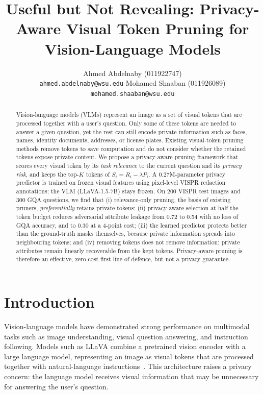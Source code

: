 \documentclass{article}
\title{Useful but Not Revealing: Privacy-Aware Visual Token Pruning
for Vision-Language Models}
\author{
  Ahmed Abdelnaby (011922747) \\
  \texttt{ahmed.abdelnaby@wsu.edu}
  \And
  Mohamed Shaaban (011926089) \\
  \texttt{mohamed.shaaban@wsu.edu}
}
\begin{document}
\maketitle

\begin{abstract}
Vision-language models (VLMs) represent an image as a set of visual tokens that are processed together with a user's question.
Only some of these tokens are needed to answer a given question, yet the rest can still encode private information such as
faces, names, identity documents, addresses, or license plates. Existing visual-token pruning methods remove tokens to save
computation and do not consider whether the retained tokens expose private content. We propose a privacy-aware pruning
framework that scores every visual token by its \emph{task relevance} to the current question and its \emph{privacy risk},
and keeps the top-$K$ tokens of $S_i = R_i - \lambda P_i$. A 0.27M-parameter privacy predictor is trained on frozen visual
features using pixel-level VISPR redaction annotations; the VLM (LLaVA-1.5-7B) stays frozen. On 200 VISPR test images and
300 GQA questions, we find that (i) relevance-only pruning, the basis of existing pruners, \emph{preferentially} retains
private tokens; (ii) privacy-aware selection at half the token budget reduces adversarial attribute leakage from 0.72 to 0.54
with no loss of GQA accuracy, and to 0.30 at a 4-point cost; (iii) the learned predictor protects better than the ground-truth
masks themselves, because private information spreads into neighbouring tokens; and (iv) removing tokens does not remove
information: private attributes remain linearly recoverable from the kept tokens. Privacy-aware pruning is therefore an
effective, zero-cost first line of defence, but not a privacy guarantee.
\end{abstract}

\section{Introduction}

Vision-language models have demonstrated strong performance on multimodal tasks such as image understanding, visual question
answering, and instruction following. Models such as LLaVA combine a pretrained vision encoder with a large language model,
representing an image as visual tokens that are processed together with natural-language instructions~\cite{liu2024improved}.
This architecture raises a privacy concern: the language model receives visual information that may be unnecessary for
answering the user's question.
\end{document}
